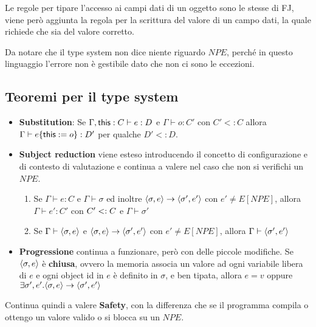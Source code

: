\noindent Le regole per tipare l'accesso ai campi dati di un oggetto sono le stesse di FJ, viene però aggiunta la regola per la scrittura del valore di un campo dati, la quale richiede che sia del valore corretto.

\begin{prooftree}
\end{prooftree}

\noindent Da notare che il type system non dice niente riguardo $NPE$, perché in questo linguaggio l'errore non è gestibile dato che non ci sono le eccezioni.

\subsection{Teoremi per il type system}

\begin{itemize}
	\item \textbf{Substitution}: Se $\Gamma, \this : C \vdash e :D$ e $\Gamma \vdash o:C'$ con $C' <: C$ allora $\Gamma \vdash e\{\this := o \} : D'$ per qualche $D' <: D$.
	\item \textbf{Subject reduction} viene esteso introducendo il concetto di configurazione e di contesto di valutazione e continua a valere nel caso che non si verifichi un $NPE$.
	\begin{enumerate}
		\item Se $\Gamma \vdash e : C$ e $\Gamma \vdash \sigma$ ed inoltre $\LA \sigma,e\RA \to \LA\sigma', e'\RA$ con $e' \neq E[NPE]$, allora $\Gamma \vdash e' :C' $ con $C' \stype C$ e $\Gamma \vdash \sigma'$
		\item Se $\Gamma \vdash \LA \sigma, e\RA$ e $\LA \sigma, e\RA \to \LA \sigma', e'\RA $ con $e'\neq E[NPE]$, allora $\Gamma \vdash \LA \sigma', e'\RA$
	\end{enumerate}
	
	\item \textbf{Progressione} continua a funzionare, però con delle piccole modifiche.
	Se $\LA \sigma, e\RA$ è \textbf{chiusa}, ovvero la memoria associa un valore ad ogni variabile libera di $e$ e ogni object id in $e$ è definito in $\sigma$, e ben tipata, allora $e=v$ oppure $\exists \sigma',e' . \LA \sigma, e\RA \to \LA \sigma', e'\RA$
\end{itemize}

Continua quindi a valere \textbf{Safety}, con la differenza che se il programma compila o ottengo un valore valido o si blocca su un $NPE$. 

